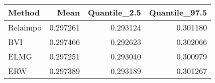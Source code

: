\begin{table}[ht]
\centering
\begin{tabular}{lrrr}
  \hline
Method & Mean & Quantile\_2.5 & Quantile\_97.5 \\ 
  \hline
Relaimpo & 0.297261 & 0.293124 & 0.301180 \\ 
  BVI & 0.297466 & 0.292623 & 0.302066 \\ 
  ELMG & 0.297251 & 0.293040 & 0.300979 \\ 
  ERW & 0.297389 & 0.293189 & 0.301267 \\ 
   \hline
\end{tabular}
\end{table}
